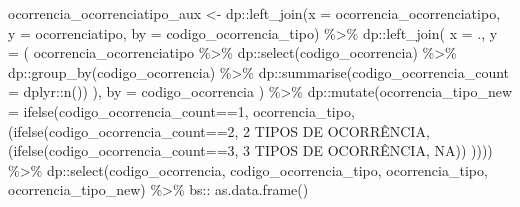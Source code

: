 \documentclass[
]{article}
\newenvironment{Shaded}{\begin{snugshade}}{\end{snugshade}}
\newcommand{\AttributeTok}[1]{\textcolor[rgb]{0.77,0.63,0.00}{#1}}
\newcommand{\DecValTok}[1]{\textcolor[rgb]{0.00,0.00,0.81}{#1}}
\newcommand{\FunctionTok}[1]{\textcolor[rgb]{0.00,0.00,0.00}{#1}}
\newcommand{\NormalTok}[1]{#1}
\newcommand{\OtherTok}[1]{\textcolor[rgb]{0.56,0.35,0.01}{#1}}
\newcommand{\SpecialCharTok}[1]{\textcolor[rgb]{0.00,0.00,0.00}{#1}}
\newcommand{\StringTok}[1]{\textcolor[rgb]{0.31,0.60,0.02}{#1}}
\begin{document}
\begin{Shaded}
\begin{Highlighting}[]
\NormalTok{ocorrencia\_ocorrenciatipo\_aux }\OtherTok{\textless{}{-}}
\NormalTok{    dp}\SpecialCharTok{::}\FunctionTok{left\_join}\NormalTok{(}\AttributeTok{x =}\NormalTok{ ocorrencia\_ocorrenciatipo,}
                     \AttributeTok{y =}\NormalTok{ ocorrenciatipo,}
                     \AttributeTok{by =} \StringTok{\textquotesingle{}codigo\_ocorrencia\_tipo\textquotesingle{}}\NormalTok{) }\SpecialCharTok{\%\textgreater{}\%}
\NormalTok{    dp}\SpecialCharTok{::}\FunctionTok{left\_join}\NormalTok{(}
        \AttributeTok{x =}\NormalTok{ .,}
        \AttributeTok{y =}\NormalTok{ (}
\NormalTok{            ocorrencia\_ocorrenciatipo }\SpecialCharTok{\%\textgreater{}\%}
\NormalTok{                dp}\SpecialCharTok{::}\FunctionTok{select}\NormalTok{(codigo\_ocorrencia) }\SpecialCharTok{\%\textgreater{}\%}
\NormalTok{                dp}\SpecialCharTok{::}\FunctionTok{group\_by}\NormalTok{(codigo\_ocorrencia) }\SpecialCharTok{\%\textgreater{}\%}
\NormalTok{                dp}\SpecialCharTok{::}\FunctionTok{summarise}\NormalTok{(}\AttributeTok{codigo\_ocorrencia\_count =}\NormalTok{ dplyr}\SpecialCharTok{::}\FunctionTok{n}\NormalTok{())}
\NormalTok{        ),}
        \AttributeTok{by =} \StringTok{\textquotesingle{}codigo\_ocorrencia\textquotesingle{}}
\NormalTok{    ) }\SpecialCharTok{\%\textgreater{}\%} 
\NormalTok{    dp}\SpecialCharTok{::}\FunctionTok{mutate}\NormalTok{(}\AttributeTok{ocorrencia\_tipo\_new =} \FunctionTok{ifelse}\NormalTok{(codigo\_ocorrencia\_count}\SpecialCharTok{==}\DecValTok{1}\NormalTok{,}
\NormalTok{                                               ocorrencia\_tipo,}
\NormalTok{                                                (}\FunctionTok{ifelse}\NormalTok{(codigo\_ocorrencia\_count}\SpecialCharTok{==}\DecValTok{2}\NormalTok{,}
                                                        \StringTok{\textquotesingle{}2 TIPOS DE OCORRÊNCIA\textquotesingle{}}\NormalTok{,}
\NormalTok{                                                        (}\FunctionTok{ifelse}\NormalTok{(codigo\_ocorrencia\_count}\SpecialCharTok{==}\DecValTok{3}\NormalTok{,}
                                                                \StringTok{\textquotesingle{}3 TIPOS DE OCORRÊNCIA\textquotesingle{}}\NormalTok{,}
                                                                \StringTok{\textquotesingle{}NA\textquotesingle{}}\NormalTok{)) )))) }\SpecialCharTok{\%\textgreater{}\%} 
\NormalTok{    dp}\SpecialCharTok{::}\FunctionTok{select}\NormalTok{(codigo\_ocorrencia, codigo\_ocorrencia\_tipo, ocorrencia\_tipo, ocorrencia\_tipo\_new) }\SpecialCharTok{\%\textgreater{}\%} 
\NormalTok{   bs}\SpecialCharTok{::} \FunctionTok{as.data.frame}\NormalTok{()}


\end{Highlighting}
\end{Shaded}
\end{document}
